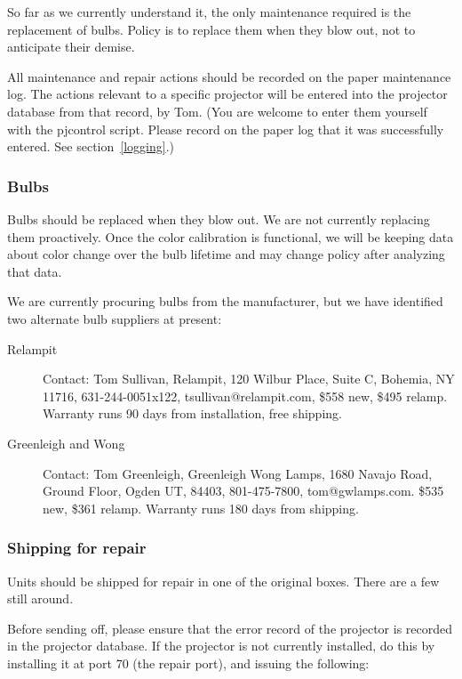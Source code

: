 \documentclass[11pt]{article}
\begin{document}
So far as we currently understand it, the only maintenance required is
the replacement of bulbs.  Policy is to replace them when they blow
out, not to anticipate their demise.

All maintenance and repair actions should be recorded on the paper
maintenance log.  The actions relevant to a specific projector will be
entered into the projector database from that record, by Tom.  (You
are welcome to enter them yourself with the pjcontrol script.  Please
record on the paper log that it was successfully entered.  See
section~\ref{logging}.) 


\subsubsection{Bulbs}

Bulbs should be replaced when they blow out.  We are not currently
replacing them proactively.  Once the color calibration is functional,
we will be keeping data about color change over the bulb lifetime and
may change policy after analyzing that data.

We are currently procuring bulbs from the manufacturer, but we have
identified two alternate bulb suppliers at present:

\begin{description}

\item[Relampit] Contact: Tom Sullivan, Relampit, 120 Wilbur Place, Suite C,
Bohemia, NY 11716, 631-244-0051x122, tsullivan@relampit.com, \$558
new, \$495 relamp.  Warranty runs 90 days from installation, free
shipping.

\item[Greenleigh and Wong] Contact: Tom Greenleigh, Greenleigh Wong Lamps, 1680
Navajo Road, Ground Floor, Ogden UT, 84403, 801-475-7800,
tom@gwlamps.com. \$535 new, \$361 relamp.  Warranty runs 180 days from
shipping.

\end{description}


\subsubsection{Shipping for repair}

Units should be shipped for repair in one of the original boxes. There
are a few still around.

Before sending off, please ensure that the error record of the
projector is recorded in the projector database. If the projector is
not currently installed, do this by installing it at port 70 (the
repair port), and issuing the following:
\end{document}
